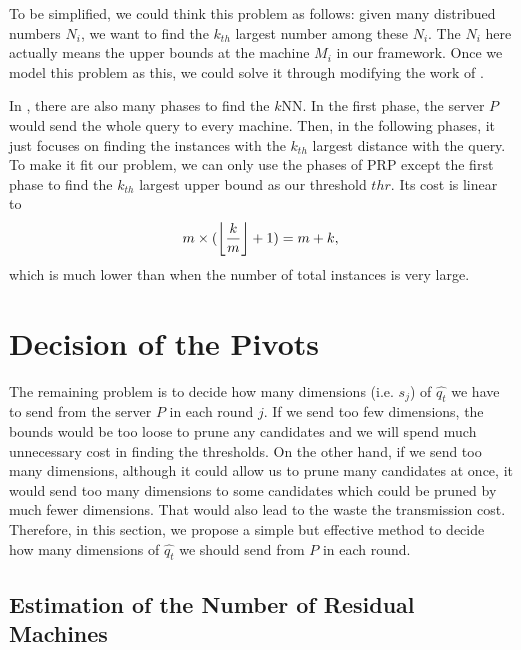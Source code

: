 To be simplified, we could think this problem as follows: given many distribued numbers $N_i$, we want to find the $k_{th}$ largest number among these $N_i$.  The $N_i$ here actually means the upper bounds at the machine $M_i$ in our framework.  Once we model this problem as this, we could solve it through modifying the work of \cite{PRP}.

In \cite{PRP}, there are also many phases to find the $k$NN.  In the first phase, the server $P$ would send the whole query to every machine.  Then, in the following phases, it just focuses on finding the instances with the $k_{th}$ largest distance with the query.  To make it fit our problem, we can only use the phases of PRP except the first phase to find the $k_{th}$ largest upper bound as our threshold $thr$.  Its cost is linear to
\[
m\times (\left \lfloor \frac{k}{m} \right \rfloor+1)=m+k,
\] which is much lower than \cite{MsWave} when the number of total instances is very large.




\section{Decision of the Pivots} %
\label{s:decide_the_pivots}

The remaining problem is to decide how many dimensions (i.e. $s_j$) of $\hat{q_t}$ we have to send from the server $P$ in each round $j$.  If we send too few dimensions, the bounds would be too loose to prune any candidates and we will spend much unnecessary cost in finding the thresholds.  On the other hand, if we send too many dimensions, although it could allow us to prune many candidates at once, it would send too many dimensions to some candidates which could be pruned by much fewer dimensions.  That would also lead to the waste the transmission cost.  Therefore, in this section, we propose a simple but effective method to decide how many dimensions of $\hat{q_t}$ we should send from $P$ in each round.


\subsection{Estimation of the Number of Residual Machines} %
\label{ss:estimate_the_number_of_residual_machines}


